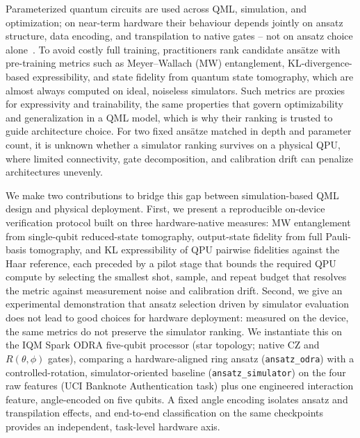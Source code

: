 \documentclass[letterpaper]{article} %
\begin{document}
Parameterized quantum circuits are used across QML, simulation, and optimization; on near-term hardware their behaviour depends jointly on ansatz structure, data encoding, and transpilation to native gates -- not on ansatz choice alone~\cite{sim2019,huang2024}.
To avoid costly full training, practitioners rank candidate ans\"atze with pre-training metrics such as Meyer--Wallach (MW) entanglement, KL-divergence-based expressibility, and state fidelity from quantum state tomography, which are almost always computed on ideal, noiseless simulators.
Such metrics are proxies for expressivity and trainability, the same properties that govern optimizability and generalization in a QML model, which is why their ranking is trusted to guide architecture choice.
For two fixed ans\"atze matched in depth and parameter count, it is unknown whether a simulator ranking survives on a physical QPU, where limited connectivity, gate decomposition, and calibration drift can penalize architectures unevenly.

We make two contributions to bridge this gap between simulation-based QML design and physical deployment.
First, we present a reproducible on-device verification protocol built on three hardware-native measures: MW entanglement from single-qubit reduced-state tomography, output-state fidelity from full Pauli-basis tomography, and KL expressibility of QPU pairwise fidelities against the Haar reference, each preceded by a pilot stage that bounds the required QPU compute by selecting the smallest shot, sample, and repeat budget that resolves the metric against measurement noise and calibration drift.
Second, we give an experimental demonstration that ansatz selection driven by simulator evaluation does not lead to good choices for hardware deployment: measured on the device, the same metrics do not preserve the simulator ranking.
We instantiate this on the IQM Spark ODRA five-qubit processor (star topology; native $\mathrm{CZ}$ and $R(\theta,\phi)$ gates), comparing a hardware-aligned ring ansatz (\texttt{ansatz\_odra}) with a controlled-rotation, simulator-oriented baseline (\texttt{ansatz\_simulator}) on the four raw features (UCI Banknote Authentication task) plus one engineered interaction feature, angle-encoded on five qubits. A fixed angle encoding isolates ansatz and transpilation effects, and end-to-end classification on the same checkpoints provides an independent, task-level hardware axis.
\end{document}
